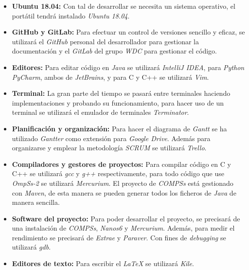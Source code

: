 \begin{itemize}
    \item \textbf{Ubuntu 18.04:} Con tal de desarrollar se necesita un sistema operativo, el portátil tendrá instalado \textit{Ubuntu 18.04}.

    \item \textbf{GitHub y GitLab:} Para efectuar un control de versiones sencillo y eficaz, se utilizará el \textit{GitHub} personal del desarrollador para gestionar la documentación y el \textit{GitLab} del grupo \textit{WDC} para gestionar el código.

    \item \textbf{Editores: } Para editar código en \textit{Java} se utilizará \textit{IntelliJ IDEA}, para \textit{Python} \textit{PyCharm}, ambos de \textit{JetBrains}, y para C y C++ se utilizará \textit{Vim}.

    \item \textbf{Terminal: } La gran parte del tiempo se pasará entre terminales haciendo implementaciones y probando su funcionamiento, para hacer uso de un terminal se utilizará el emulador de terminales \textit{Terminator}.

    \item \textbf{Planificación y organización: } Para hacer el diagrama de \textit{Gantt} se ha utilizado \textit{Gantter} como extensión para \textit{Google Drive}. Además para organizarse y emplear la metodología \textit{SCRUM} se utilizará \textit{Trello}.

    \item \textbf{Compiladores y gestores de proyectos: } Para compilar código en C y C++ se utilizará \textit{gcc} y \textit{g++} respectivamente, para todo código que use \textit{OmpSs-2} se utilizará \textit{Mercurium}. El proyecto de \textit{COMPSs} está gestionado con \textit{Maven}, de esta manera se pueden generar todos los ficheros de \textit{Java} de manera sencilla. 
    
    \item \textbf{Software del proyecto: } Para poder desarrollar el proyecto, se precisará de una instalación de \textit{COMPSs}, \textit{Nanos6} y \textit{Mercurium}. Además, para medir el rendimiento se precisará de \textit{Extrae} y \textit{Paraver}. Con fines de \textit{debugging} se utilizará \textit{gdb}.

    \item \textbf{Editores de texto: } Para escribir el \textit{LaTeX} se utilizará \textit{Kile}.
\end{itemize}

